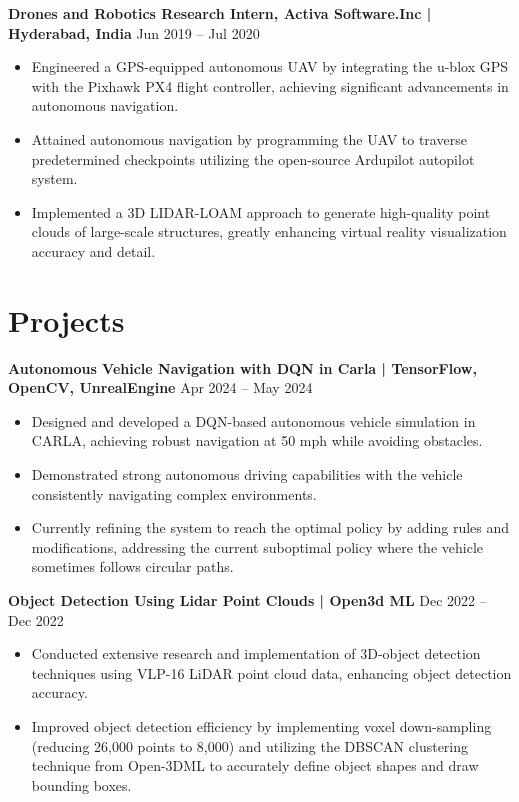 \documentclass[a4paper,10pt]{article}
\begin{document}
\noindent\textbf{Drones and Robotics Research Intern, Activa Software.Inc  | Hyderabad, India} \hfill Jun 2019 – Jul 2020
\begin{itemize}
    \item Engineered a GPS-equipped autonomous UAV by integrating the u-blox GPS with the Pixhawk PX4 flight controller, achieving significant advancements in autonomous navigation.
    \item Attained autonomous navigation by programming the UAV to traverse predetermined checkpoints utilizing the open-source Ardupilot autopilot system.
    \item Implemented a 3D LIDAR-LOAM approach to generate high-quality point clouds of large-scale structures, greatly enhancing virtual reality visualization accuracy and detail.
\end{itemize}

\section*{Projects}
\noindent\textbf{Autonomous Vehicle Navigation with DQN in Carla | TensorFlow, OpenCV, UnrealEngine} \hfill Apr 2024 – May 2024
\begin{itemize}
    \item Designed and developed a DQN-based autonomous vehicle simulation in CARLA, achieving robust navigation at 50 mph while avoiding obstacles.
    \item Demonstrated strong autonomous driving capabilities with the vehicle consistently navigating complex environments.
    \item Currently refining the system to reach the optimal policy by adding rules and modifications, addressing the current suboptimal policy where the vehicle sometimes follows circular paths.
\end{itemize}

\noindent\textbf{Object Detection Using Lidar Point Clouds | Open3d ML} \hfill Dec 2022 – Dec 2022
\begin{itemize}
    \item Conducted extensive research and implementation of 3D-object detection techniques using VLP-16 LiDAR point cloud data, enhancing object detection accuracy.
    \item Improved object detection efficiency by implementing voxel down-sampling (reducing 26,000 points to 8,000) and utilizing the DBSCAN clustering technique from Open-3DML to accurately define object shapes and draw bounding boxes.
\end{itemize}
\end{document}
